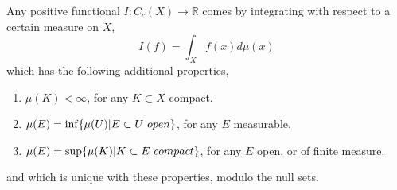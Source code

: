\documentclass[10pt,a4paper]{amsart}
\begin{document}
\begin{theorem}[Riesz]
Any positive functional $I:C_c(X)\to\mathbb R$ comes by integrating with respect to a certain measure on $X$,
$$I(f)=\int_Xf(x)d\mu(x)$$
which has the following additional properties,
\begin{enumerate}
\item $\mu(K)<\infty$, for any $K\subset X$ compact.

\item $\mu(E)=\inf\{\mu(U)|E\subset U\ {\rm open}\}$, for any $E$ measurable.

\item $\mu(E)=\sup\{\mu(K)|K\subset E\ {\rm compact}\}$, for any $E$ open, or of finite measure.
\end{enumerate}
and which is unique with these properties, modulo the null sets.
\end{theorem}
\end{document}
